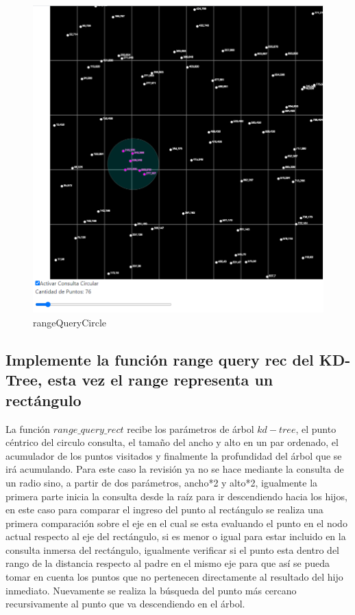\documentclass{article}
\begin{document}
    		\begin{figure}[H]
    			\centering
    			\includegraphics[scale=0.45]{img/circular1.png}
    			\caption{rangeQueryCircle}
    			\label{fig:circular1}
    		\end{figure}
    		
    	\subsection{Implemente la función range query rec del KD-Tree, esta vez el range representa un rectángulo} 
    	    La función $range\_query\_rect$ recibe los parámetros de árbol $kd-tree$, el punto céntrico del circulo consulta, el tamaño del ancho y alto en un par ordenado, el acumulador de los puntos visitados y finalmente la profundidad del árbol que se irá acumulando. Para este caso la revisión ya no se hace mediante la consulta de un radio sino, a partir de dos parámetros, ancho*2 y alto*2, igualmente la primera parte inicia la consulta desde la raíz para ir descendiendo hacia los hijos, en este caso para comparar el ingreso del punto al rectángulo se realiza una primera comparación sobre el eje en el cual se esta evaluando el punto en el nodo actual respecto al eje del rectángulo, si es menor o igual para estar incluido en la consulta inmersa del rectángulo, igualmente verificar si el punto esta dentro del rango de la distancia respecto al padre en el mismo eje para que así se pueda tomar en cuenta los puntos que no pertenecen directamente al resultado del hijo inmediato. Nuevamente se realiza la búsqueda del punto más cercano recursivamente al punto que va descendiendo en el árbol.
    	    
\end{document}
